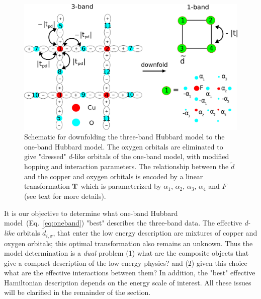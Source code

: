 \begin{figure}
\centering
\includegraphics[width=0.8\linewidth]{./Figures/three_band_figure.eps}
\caption{Schematic for downfolding the three-band Hubbard model to the one-band Hubbard model. The oxygen orbitals are 
eliminated to give "dressed" $d$-like orbitals of the one-band model, with modified hopping and interaction parameters. 
The relationship between the $\tilde{d}$ and the copper and oxygen orbitals is encoded by a linear transformation 
${\bf T}$ which is parameterized by $\alpha_1$, $\alpha_2$, $\alpha_3$, $\alpha_4$ and $F$ (see text for more details).}
\label{fig:threeband} 
\end{figure}

It is our objective to determine what one-band Hubbard model~(Eq.~\ref{eq:oneband}) 
"best" describes the three-band data. The effective \textit{d-like} orbitals $\tilde{d}_{i,\sigma}$, 
that enter the low energy description are mixtures of copper and oxygen orbitals; this optimal transformation also remains an unknown. 
Thus the model determination is a \textit{dual} problem (1) what are the composite objects that give a 
compact description of the low energy physics? and (2) given this choice what are the effective interactions between them? 
In addition, the "best" effective Hamiltonian description depends on the energy scale of interest. 
All these issues will be clarified in the remainder of the section. 

